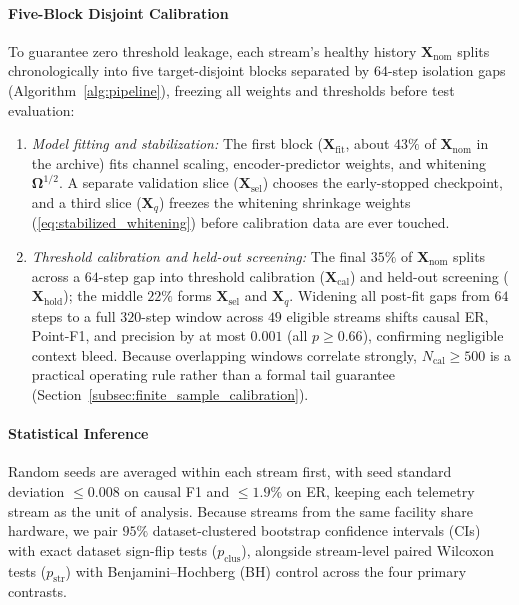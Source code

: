 \paragraph{Five-Block Disjoint Calibration}
To guarantee zero threshold leakage, each stream's healthy history $\mathbf{X}_{\text{nom}}$ splits chronologically into five target-disjoint blocks separated by $64$-step isolation gaps (Algorithm~\ref{alg:pipeline}), freezing all weights and thresholds before test evaluation:
\begin{enumerate}[leftmargin=*, nosep, itemsep=1pt]
    \item \emph{Model fitting and stabilization:} The first block ($\mathbf{X}_{\text{fit}}$, about $43\%$ of $\mathbf{X}_{\text{nom}}$ in the archive) fits channel scaling, encoder-predictor weights, and whitening $\mathbf{\Omega}^{1/2}$. A separate validation slice ($\mathbf{X}_{\text{sel}}$) chooses the early-stopped checkpoint, and a third slice ($\mathbf{X}_q$) freezes the whitening shrinkage weights (\ref{eq:stabilized_whitening}) before calibration data are ever touched.
    \item \emph{Threshold calibration and held-out screening:} The final $35\%$ of $\mathbf{X}_{\text{nom}}$ splits across a $64$-step gap into threshold calibration ($\mathbf{X}_{\text{cal}}$) and held-out screening ($\mathbf{X}_{\text{hold}}$); the middle $22\%$ forms $\mathbf{X}_{\text{sel}}$ and $\mathbf{X}_q$. Widening all post-fit gaps from $64$ steps to a full $320$-step window across $49$ eligible streams shifts causal ER, Point-F1, and precision by at most $0.001$ (all $p \ge 0.66$), confirming negligible context bleed. Because overlapping windows correlate strongly, $N_{\text{cal}} \ge 500$ is a practical operating rule rather than a formal tail guarantee (Section~\ref{subsec:finite_sample_calibration}).
\end{enumerate}

\paragraph{Statistical Inference}
Random seeds are averaged within each stream first, with seed standard deviation $\le 0.008$ on causal F1 and $\le 1.9\%$ on ER, keeping each telemetry stream as the unit of analysis. Because streams from the same facility share hardware, we pair $95\%$ dataset-clustered bootstrap confidence intervals (CIs) with exact dataset sign-flip tests ($p_{\text{clus}}$), alongside stream-level paired Wilcoxon tests ($p_{\text{str}}$) with Benjamini--Hochberg (BH) control \cite{benjamini1995controlling} across the four primary contrasts.

